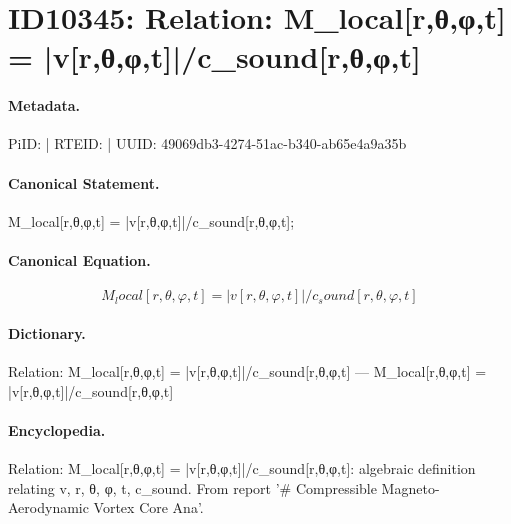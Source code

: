 \section*{ID10345: Relation: M\_local[r,θ,φ,t] = |v[r,θ,φ,t]|/c\_sound[r,θ,φ,t]}
\paragraph{Metadata.}
PiID:  | RTEID:  | UUID: 49069db3-4274-51ac-b340-ab65e4a9a35b

\paragraph{Canonical Statement.}
M\_local[r,θ,φ,t] = |v[r,θ,φ,t]|/c\_sound[r,θ,φ,t];

\paragraph{Canonical Equation.}
\[
M_local[r,θ,φ,t] = |v[r,θ,φ,t]|/c_sound[r,θ,φ,t]
\]

\paragraph{Dictionary.}
Relation: M\_local[r,θ,φ,t] = |v[r,θ,φ,t]|/c\_sound[r,θ,φ,t] — M\_local[r,θ,φ,t] = |v[r,θ,φ,t]|/c\_sound[r,θ,φ,t]

\paragraph{Encyclopedia.}
Relation: M\_local[r,θ,φ,t] = |v[r,θ,φ,t]|/c\_sound[r,θ,φ,t]: algebraic definition relating v, r, θ, φ, t, c\_sound. From report '\# Compressible Magneto-Aerodynamic Vortex Core Ana'.
